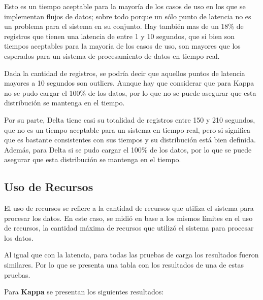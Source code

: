 Esto es un tiempo aceptable para la mayoría de los casos de uso en los que se implementan flujos de datos;
sobre todo porque un sólo punto de latencia no es un problema para el sistema en su conjunto.
Hay también mas de un 18\% de registros que tienen una latencia de entre 1 y 10 segundos, 
que si bien son tiempos aceptables para la mayoría de los casos de uso, son mayores que los esperados para un sistema de procesamiento de datos en tiempo real. \newline

Dada la cantidad de registros, se podría decir que aquellos puntos de latencia mayores a 10 segundos son outliers.
Aunque hay que considerar que para Kappa no se pudo cargar el 100\% de los datos,
por lo que no se puede asegurar que esta distribución se mantenga en el tiempo. \newline


Por su parte, Delta tiene casi su totalidad de registros entre 150 y 210 segundos,
que no es un tiempo aceptable para un sistema en tiempo real, 
pero si significa que es bastante consistentes con sus tiempos y su distribución está bien definida.
Además, para Delta si se pudo cargar el 100\% de los datos, por lo que se puede asegurar que esta distribución se mantenga en el tiempo.

\newpage

\newpage
\subsection{Uso de Recursos}

El uso de recursos se refiere a la cantidad de recursos que utiliza el sistema para procesar los datos.
En este caso, se midió en base a los mismos límites en el uso de recursos, 
la cantidad máxima de recursos que utilizó el sistema para procesar los datos. \newline

Al igual que con la latencia, para todas las pruebas de carga los resultados fueron similares. 
Por lo que se presenta una tabla con los resultados de una de estas pruebas. \newline

Para \textbf{Kappa} se presentan los siguientes resultados:

